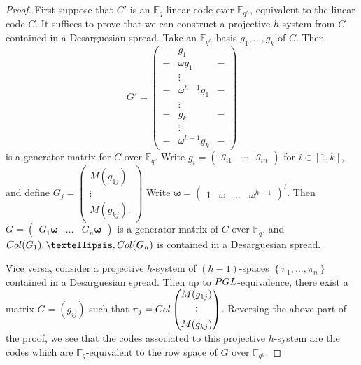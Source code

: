 \documentclass[a4paper]{article}
\theoremstyle{definition}
\newcommand{\FF}{\mathbb F}
\newcommand{\set}[1]{ \left \{ #1 \right \} }
\newcommand{\col}{\textnormal{Col}}
\newcommand{\pgl}{\textnormal{PGL}}
\begin{document}
\begin{proof}
First suppose that $C'$ is an $\FF_q$-linear code over $\FF_{q^h}$, equivalent to the linear code $C$.
It suffices to prove that we can construct a projective $h$-system from $C$ contained in a Desarguesian spread.
Take an $\FF_{q^h}$-basis $g_1, \dots, g_k$ of $C$.
Then
\[
 G' = \begin{pmatrix}
  - & g_1 & - \\ - & \omega g_1 & - \\
  & \vdots & \\ 
  - & \omega^{h-1} g_1 & - \\
  & \vdots & \\
  - & g_k & - \\
  & \vdots \\
  - & \omega^{h-1} g_k & - 
 \end{pmatrix}
\]
is a generator matrix for $C$ over $\FF_q$.
Write 
\(
g_i = \begin{pmatrix} g_{i1} & \dots & g_{in} \end{pmatrix}
\) for $i \in [1,k]$, and define
\(
 G_j = \begin{pmatrix}
  M(g_{1j}) \\ \vdots \\ M(g_{kj}).
 \end{pmatrix}
\)
Write 
\(
 \boldsymbol \omega = \begin{pmatrix}
  1 & \omega & \dots & \omega^{h-1}
 \end{pmatrix}^t
\).
Then
\(
 G = \begin{pmatrix} G_1 \boldsymbol \omega & \dots & G_n \boldsymbol \omega \end{pmatrix}
\)
is a generator matrix of $C$ over $\FF_q$, and $\col (G_1), \dots, \col (G_n)$ is contained in a Desarguesian spread.

Vice versa, consider a projective $h$-system of $(h-1)$-spaces $\set{\pi_1, \dots, \pi_n}$ contained in a Desarguesian spread.
Then up to $\pgl$-equivalence, there exist a matrix $G = (g_{ij})$ such that 
\(
\pi_j = \col \begin{pmatrix}
 M(g_{1j}) \\ \vdots \\ M(g_{kj})
\end{pmatrix}
\).
Reversing the above part of the proof, we see that the codes associated to this projective $h$-system are the codes which are $\FF_q$-equivalent to the row space of $G$ over $\FF_{q^h}$.
\end{proof}
\end{document}
